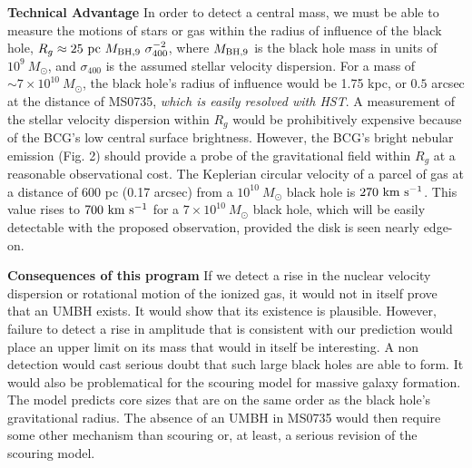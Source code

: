 \documentclass[12pt]{article}
\begin{document}
{\bf Technical Advantage} In order to detect a central mass, we must be able to measure the motions of stars or gas within the radius of influence of the black hole,
$R_g\approx 25~{\rm pc}~M_{\rm BH,9}~\sigma_{400}^{-2}$, where $M_{\rm BH,9}$ is the black hole mass in units of $10^9~M_{\odot}$, and $ \sigma_{400}$ is the assumed stellar velocity dispersion.  For a mass of $\sim 7\times 10^{10}~ M_\odot$, the
black hole's  radius of influence would be
1.75 kpc, or $0.5$ arcsec at the distance of MS0735, {\it which is easily resolved with HST}. 
A measurement of the stellar velocity dispersion within $R_g$ would be prohibitively expensive because of the BCG's low central surface brightness.  However, the BCG's bright nebular emission (Fig. 2) should provide a probe of the gravitational field within $R_g$ at a reasonable observational cost. 
The Keplerian circular velocity of a parcel of gas at a distance of 600 pc (0.17 arcsec)  from a $10^{10} ~ M_\odot$ black hole is $270 
~ \rm km~s^{-1}$.  This value rises
to $700 ~\rm km~s^{-1}$ for a $7\times 10^{10}~ M_\odot$ black hole, which will be easily detectable with the proposed observation,
provided the disk is seen nearly edge-on.

{\bf Consequences of this program} If we detect a rise in the nuclear velocity dispersion or rotational motion of the ionized gas, it would not in itself prove that an UMBH exists.
It would show that its existence is plausible.  However, failure to detect a 
rise in amplitude that is consistent with our prediction would place an upper limit on its mass that would in itself be interesting.
A non detection would cast serious doubt that such large black holes
are able to form.   It would also be problematical for the scouring model for massive galaxy formation.  The model predicts
core sizes that are on the same order as the black hole's gravitational radius.  The absence of an UMBH in MS0735 would then require some other mechanism than scouring or, at least, a serious revision of the scouring model. 
\end{document}
